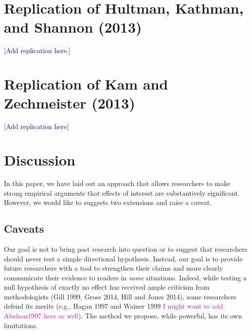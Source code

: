 \documentclass[12pt]{article}
\newcommand{\kelly}[1]{\textcolor{blue}{#1}}
\newcommand{\carlisle}[1]{\textcolor{magenta}{#1}}
\begin{document}


\section*{Replication of Hultman, Kathman, and Shannon (2013)}

\kelly{[Add replication here.]}

\section*{Replication of Kam and Zechmeister (2013)}

\kelly{[Add replication here]}

\section*{Discussion}

In this paper, we have laid out an approach that allows researchers to make strong empirical arguments that effects of interest are substantively significant. However, we would like to suggests two extensions and raise a caveat.

\subsection*{Caveats}

Our goal is not to bring past research into question or to suggest that researchers should never test a simple directional hypothesis. Instead, our goal is to provide future researchers with a tool to strengthen their claims and more clearly communicate their evidence to readers in \textit{some} situations. Indeed, while testing a null hypothesis of exactly no effect has received ample criticism from methodologists (Gill 1999, Gross 2014, Hill and Jones 2014), some researchers defend its merits (e.g., Hagan 1997 and Wainer 1999 \carlisle{I might want to add Abelson1997 here as well}). The method we propose, while powerful, has its own limitations.
\end{document}
